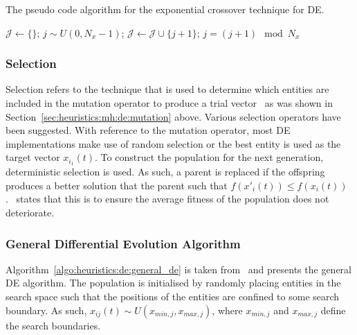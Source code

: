 \begin{algorithm}[H]
      \caption{The pseudo code algorithm for the exponential crossover technique for \acs{DE}.}
      \label{algo:heuristics:de:exp}
      \begin{algorithmic}
            \State $\mathcal{J} \gets \{\}$;
            \State $j \sim U(0,N_{x} - 1)$;
            \Repeat
            \State $\mathcal{J} \gets \mathcal{J} \cup \{j + 1 \}$;
            \State $j = (j+1) \mod N_{x}$
      \end{algorithmic}
\end{algorithm}

\subsubsection{Selection}
\label{sec:heuristics:mh:de:selection}

Selection refers to the technique that is used to determine which entities are included in the mutation operator to produce a trial vector~\cite{ref:engelbrecht:2007} as was shown in Section~\ref{sec:heuristics:mh:de:mutation} above. Various selection operators have been suggested. With reference to the mutation operator, most \acs{DE} implementations make use of random selection or the best entity is used as the target vector $x_{i_{1}}(t)$. To construct the population for the next generation, deterministic selection is used. As such, a parent is replaced if the offspring produces a better solution that the parent such that $f(x'_{i}(t)) \leq f(x_{i}(t))$.~\citeauthor{ref:engelbrecht:2007}\cite{ref:engelbrecht:2007} states that this is to ensure the average fitness of the population does not deteriorate.


\subsubsection{General Differential Evolution Algorithm}

Algorithm~\ref{algo:heuristics:de:general_de} is taken from~\cite{ref:engelbrecht:2007} and presents the general \acs{DE} algorithm. The population is initialised by randomly placing entities in the search space such that the positions of the entities are confined to some search boundary. As such, $x_{ij}(t) \sim U(x_{min,j}, x_{max,j})$, where $x_{min,j}$ and $x_{max,j}$ define the search boundaries.

